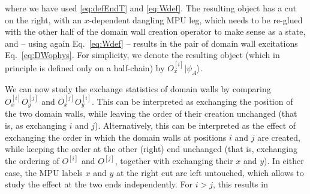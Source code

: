 \documentclass[aps,pra,export,nofootinbib]{revtex4-2}
\begin{document}
where we have used \eqref{eq:defEndT}  and \eqref{eq:Wdef}. The resulting object has a cut on the right, with an $x$-dependent dangling MPU leg, which needs to be re-glued with the other half of the domain wall creation operator to make sense as a state, and -- using again Eq.~\eqref{eq:Wdef} -- results in the pair of domain wall excitations Eq.~\eqref{eq:DWophys}.  For simplicity, we denote the resulting object (which in principle is defined only on a half-chain) by $O_x^{[i]}\lvert\psi_A\rangle$.

We can now study the exchange statistics of domain walls by comparing  $O^{[i]}_xO^{[j]}_y$ and $O^{[j]}_xO^{[i]}_y$.
This can be interpreted as exchanging the position of the two domain walls, while leaving the order of their creation unchanged (that is, as exchanging $i$ and $j$). Alternatively, this can be interpreted as the effect of exchanging the order in which the domain walls at positions $i$ and $j$ are created, while keeping the order at the other (right) end unchanged (that is, exchanging the ordering of $O^{[i]}$ and $O^{[j]}$, together with exchanging their $x$ and $y$). In either case, the MPU labels $x$ and $y$ at the right cut are left untouched, which allows to study the effect at the two ends independently.
For $i>j$, this results in
\end{document}
